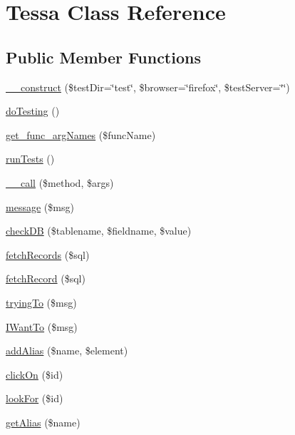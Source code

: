 \hypertarget{classTessa}{}\section{Tessa Class Reference}
\label{classTessa}
\subsection*{Public Member Functions}
\begin{DoxyCompactItemize}
\item 
\hyperlink{classTessa_a27029de5d49d60f83ad7f3afa0db0855}{\+\_\+\+\_\+construct} (\$test\+Dir=\char`\"{}test\char`\"{}, \$browser=\char`\"{}firefox\char`\"{}, \$test\+Server=\char`\"{}\char`\"{})
\item 
\hyperlink{classTessa_a0b42134840fdfef2437c3b2c0c9908b6}{do\+Testing} ()
\item 
\hyperlink{classTessa_a4053ed1b45b0faf76850ee56f2a8578f}{get\+\_\+func\+\_\+arg\+Names} (\$func\+Name)
\item 
\hyperlink{classTessa_a6434d421f09903b7226efba76a050c85}{run\+Tests} ()
\item 
\hyperlink{classTessa_ac4ec71dc20d7f8c1494c56115eeb534d}{\+\_\+\+\_\+call} (\$method, \$args)
\item 
\hyperlink{classTessa_a7e4c039b8228d75810747b96b5062366}{message} (\$msg)
\item 
\hyperlink{classTessa_a54a265707312dd6c5ec290d4877ec05a}{check\+D\+B} (\$tablename, \$fieldname, \$value)
\item 
\hyperlink{classTessa_a54fe80d4ffe3cd047ca3c15e100bbd5c}{fetch\+Records} (\$sql)
\item 
\hyperlink{classTessa_a9e3c7e459e53b5696e8d646d09c05dba}{fetch\+Record} (\$sql)
\item 
\hyperlink{classTessa_ac95db31344f3edd1c2951ce6e0f585db}{trying\+To} (\$msg)
\item 
\hyperlink{classTessa_a9996261064c450e61e6530ec0441b945}{I\+Want\+To} (\$msg)
\item 
\hyperlink{classTessa_aafeac59dfa47fb1501a521bcf9438f15}{add\+Alias} (\$name, \$element)
\item 
\hyperlink{classTessa_a983d3117227db7bf254466936aa8a989}{click\+On} (\$id)
\item 
\hyperlink{classTessa_a1d6ad14ab105a7524cb4f08bfd1d73ca}{look\+For} (\$id)
\item 
\hyperlink{classTessa_a5bf96722ac914ff51e848b14891fb2c0}{get\+Alias} (\$name)
\item 

\end{DoxyCompactItemize}
